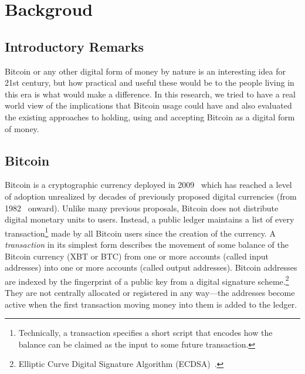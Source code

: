 

\chapter{Backgroud}

\section{Introductory Remarks}

Bitcoin or any other digital form of money by nature is an interesting idea for 21st century, but how practical and useful these would be to the people living in this era is what would make a difference. 
In this research, we tried to have a real world view of the implications that Bitcoin usage could have and also evaluated the existing approaches to holding, using and accepting Bitcoin as a digital form of money.





\section{Bitcoin}
Bitcoin is a cryptographic currency deployed in 2009~\cite{Nak08} which has reached a level of adoption unrealized by decades of previously proposed digital currencies (from 1982~\cite{Cha82} onward). Unlike many previous proposals, Bitcoin does not distribute digital monetary units to users. Instead, a public ledger maintains a list of every transaction\footnote{Technically, a transaction specifies a short script that encodes how the balance can be claimed as the input to some future transaction.} made by all Bitcoin users since the creation of the currency. A \textit{transaction} in its simplest form describes the movement of some balance of the Bitcoin currency (XBT or BTC) from one or more accounts (called input addresses) into one or more accounts (called output addresses). Bitcoin addresses are indexed by the fingerprint of a public key from a digital signature scheme.\footnote{Elliptic Curve Digital Signature Algorithm (ECDSA)~\cite{ecdsa}.} They are not centrally allocated or registered in any way---the addresses become active when the first transaction moving money into them is added to the ledger. 


